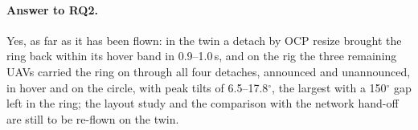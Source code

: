 
\paragraph{Answer to RQ2.} Yes, as far as it has been flown: in the twin a detach by OCP resize brought the
ring back within its hover band in 0.9--1.0\,s, and on the rig the three remaining UAVs carried the ring on
through all four detaches, announced and unannounced, in hover and on the circle, with peak tilts of
6.5--17.8$^\circ$, the largest with a 150$^\circ$ gap left in the ring; the layout study and the comparison
with the network hand-off are still to be re-flown on the twin.
